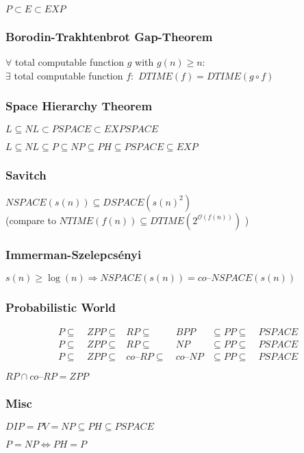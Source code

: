\documentclass[
    13pt,
    oneside,
    a4paper,
    numbers=enddot,
    abstractoff,
    parskip=full
]{scrreprt}
\begin{document}
$P \subset E \subset EXP$


\subsubsection*{Borodin-Trakhtenbrot Gap-Theorem}

$\forall$ total computable function $g$ with $g(n) \geq n$:\\
$\exists$ total computable function $f:$
    $ DTIME(f) = DTIME (g \circ f) $



\subsubsection*{Space Hierarchy Theorem}

$ L \subseteq NL \subset PSPACE \subset EXPSPACE $

$ L \subseteq NL \subseteq P \subseteq NP \subseteq PH \subseteq PSPACE \subseteq EXP$


\subsubsection*{Savitch}

$ NSPACE(s(n)) \subseteq DSPACE(s(n)^2)$
\\
(compare to $ NTIME(f(n)) \subseteq DTIME(2^{\mathcal{O}(f(n))})$ )


\subsubsection*{Immerman-Szelepcsényi}

$s(n) \geq \log(n) \Longrightarrow NSPACE(s(n)) = co\text{--}NSPACE(s(n))$


\subsubsection*{Probabilistic World}

\begin{align*}
    P \subseteq~& ZPP \subseteq & RP \subseteq~& BPP & \subseteq PP \subseteq~& PSPACE
    \\
    P \subseteq~& ZPP \subseteq & RP \subseteq~& NP & \subseteq PP \subseteq~& PSPACE
    \\
    P \subseteq~& ZPP \subseteq & co\text{--}RP \subseteq~& co\text{--}NP & \subseteq PP \subseteq~& PSPACE
\end{align*}

$ RP \cap co\text{--}RP = ZPP $


\subsubsection*{Misc}

$ DIP = PV = NP \subseteq PH \subseteq PSPACE $

$ P = NP \Longleftrightarrow PH = P $
\end{document}
